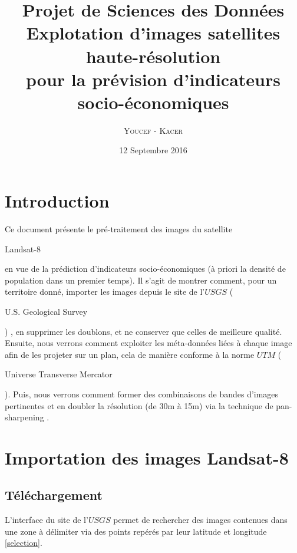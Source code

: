 \documentclass{book}
\title{%
  Projet de Sciences des Données \\
  \large Explotation d'images satellites haute-résolution \\pour la prévision d'indicateurs socio-économiques \\
    }
\author{\textsc{Youcef} - \textsc{Kacer}}
\date{12 Septembre 2016}
\begin{document}
 
\maketitle

\tableofcontents

\frontmatter
\chapter{Introduction}
Ce document présente le pré-traitement des images du satellite \begin{itshape}Landsat-8\end{itshape} en vue de la prédiction d'indicateurs socio-économiques (à 
priori la densité de population dans un premier temps). Il s'agit de montrer comment, pour un territoire donné,
importer les images depuis le site de l'$USGS$ (\begin{itshape}U.S. Geological Survey\end{itshape}) \cite{landsat8}, en supprimer les doublons, et ne conserver 
que celles de meilleure qualité.
Ensuite, nous verrons comment exploiter les méta-données liées à chaque image afin de les projeter sur un plan, cela de manière conforme
à la norme $UTM$ (\begin{itshape}Universe Transverse Mercator\end{itshape}).
Puis, nous verrons comment former des combinaisons de bandes d'images pertinentes et en doubler la résolution (de 30m à 15m) via
la technique de \og pan-sharpening \fg{}.
\mainmatter

\chapter{Importation des images Landsat-8}
\section{Téléchargement}

L'interface du site de l'$USGS$ permet de rechercher des images contenues dans une zone à délimiter via des points repérés par 
leur latitude et longitude \ref{selection}.\\
\end{document}
